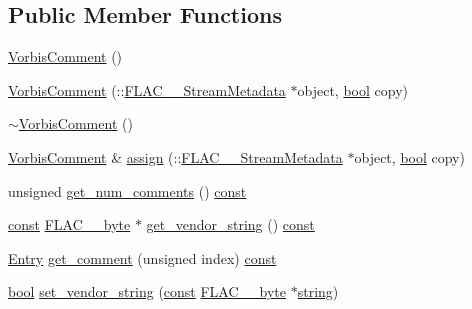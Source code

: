 \subsection*{Public Member Functions}
\begin{DoxyCompactItemize}
\item 
\hyperlink{class_f_l_a_c_1_1_metadata_1_1_vorbis_comment_a6d31c1846957ba80a0ca73a91cea0714}{Vorbis\+Comment} ()
\item 
\hyperlink{class_f_l_a_c_1_1_metadata_1_1_vorbis_comment_a65a73f4665db16ac7aec76e9f5e699f2}{Vorbis\+Comment} (\+::\hyperlink{struct_f_l_a_c_____stream_metadata}{F\+L\+A\+C\+\_\+\+\_\+\+Stream\+Metadata} $\ast$object, \hyperlink{mac_2config_2i386_2lib-src_2libsoxr_2soxr-config_8h_abb452686968e48b67397da5f97445f5b}{bool} copy)
\item 
\hyperlink{class_f_l_a_c_1_1_metadata_1_1_vorbis_comment_af585c58d3d84412343ac7d46a0335675}{$\sim$\+Vorbis\+Comment} ()
\item 
\hyperlink{class_f_l_a_c_1_1_metadata_1_1_vorbis_comment}{Vorbis\+Comment} \& \hyperlink{class_f_l_a_c_1_1_metadata_1_1_vorbis_comment_a9db2171c398cd62a5907e625c3a6228d}{assign} (\+::\hyperlink{struct_f_l_a_c_____stream_metadata}{F\+L\+A\+C\+\_\+\+\_\+\+Stream\+Metadata} $\ast$object, \hyperlink{mac_2config_2i386_2lib-src_2libsoxr_2soxr-config_8h_abb452686968e48b67397da5f97445f5b}{bool} copy)
\item 
unsigned \hyperlink{class_f_l_a_c_1_1_metadata_1_1_vorbis_comment_ab63b3a079d91e2497d133a26cf8be2cd}{get\+\_\+num\+\_\+comments} () \hyperlink{getopt1_8c_a2c212835823e3c54a8ab6d95c652660e}{const} 
\item 
\hyperlink{getopt1_8c_a2c212835823e3c54a8ab6d95c652660e}{const} \hyperlink{ordinals_8h_a5eb569b12d5b047cdacada4d57924ee3}{F\+L\+A\+C\+\_\+\+\_\+byte} $\ast$ \hyperlink{class_f_l_a_c_1_1_metadata_1_1_vorbis_comment_a86ef43d506a6e4992b3bf3e2c227f54e}{get\+\_\+vendor\+\_\+string} () \hyperlink{getopt1_8c_a2c212835823e3c54a8ab6d95c652660e}{const} 
\item 
\hyperlink{class_f_l_a_c_1_1_metadata_1_1_vorbis_comment_1_1_entry}{Entry} \hyperlink{class_f_l_a_c_1_1_metadata_1_1_vorbis_comment_affce4cadbfc6334af4656b26ff2cb32d}{get\+\_\+comment} (unsigned index) \hyperlink{getopt1_8c_a2c212835823e3c54a8ab6d95c652660e}{const} 
\item 
\hyperlink{mac_2config_2i386_2lib-src_2libsoxr_2soxr-config_8h_abb452686968e48b67397da5f97445f5b}{bool} \hyperlink{class_f_l_a_c_1_1_metadata_1_1_vorbis_comment_ad8cffdb4c43ba01eaa9a3f7be0d5926a}{set\+\_\+vendor\+\_\+string} (\hyperlink{getopt1_8c_a2c212835823e3c54a8ab6d95c652660e}{const} \hyperlink{ordinals_8h_a5eb569b12d5b047cdacada4d57924ee3}{F\+L\+A\+C\+\_\+\+\_\+byte} $\ast$\hyperlink{test__lib_f_l_a_c_2format_8c_ab02026ad0de9fb6c1b4233deb0a00c75}{string})

\end{DoxyCompactItemize}
